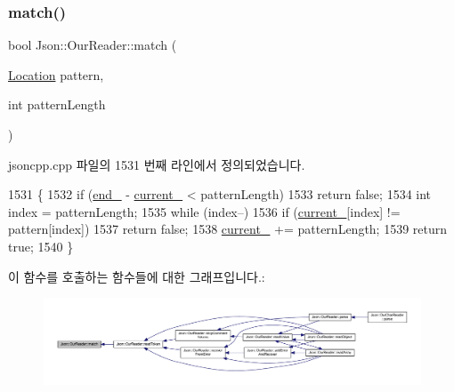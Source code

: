 \subsubsection{\texorpdfstring{match()}{match()}}
{\footnotesize\ttfamily bool Json\+::\+Our\+Reader\+::match (\begin{DoxyParamCaption}\item[{\hyperlink{class_json_1_1_our_reader_a1bdc7bbc52ba87cae6b19746f2ee0189}{Location}}]{pattern,  }\item[{int}]{pattern\+Length }\end{DoxyParamCaption})\hspace{0.3cm}{\ttfamily [private]}}



jsoncpp.\+cpp 파일의 1531 번째 라인에서 정의되었습니다.


\begin{DoxyCode}
1531                                                          \{
1532   \textcolor{keywordflow}{if} (\hyperlink{class_json_1_1_our_reader_ab1f69b0260c27a0d2d65dc56e42c8f9d}{end\_} - \hyperlink{class_json_1_1_our_reader_a5211fbbba94be80a22dd2317c621efcc}{current\_} < patternLength)
1533     \textcolor{keywordflow}{return} \textcolor{keyword}{false};
1534   \textcolor{keywordtype}{int} index = patternLength;
1535   \textcolor{keywordflow}{while} (index--)
1536     \textcolor{keywordflow}{if} (\hyperlink{class_json_1_1_our_reader_a5211fbbba94be80a22dd2317c621efcc}{current\_}[index] != pattern[index])
1537       \textcolor{keywordflow}{return} \textcolor{keyword}{false};
1538   \hyperlink{class_json_1_1_our_reader_a5211fbbba94be80a22dd2317c621efcc}{current\_} += patternLength;
1539   \textcolor{keywordflow}{return} \textcolor{keyword}{true};
1540 \}
\end{DoxyCode}
이 함수를 호출하는 함수들에 대한 그래프입니다.\+:\nopagebreak
\begin{figure}[H]
\begin{center}
\leavevmode
\includegraphics[width=350pt]{class_json_1_1_our_reader_a4a03f1b266def9b47c4fef35386557fb_icgraph}
\end{center}
\end{figure}
\mbox{\label{class_json_1_1_our_reader_ad418de7c47bd3d0510888e22110b796e}} 
